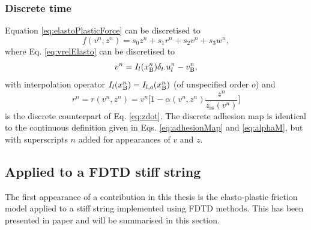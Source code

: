 \subsubsection{Discrete time}
Equation \eqref{eq:elastoPlasticForce} can be discretised to
\begin{equation}\label{eq:discForceFunction}
    f(v^n,z^n) = s_0z^n + s_1r^n+s_2v^n+s_3w^n,
\end{equation} 
where Eq. \eqref{eq:vrelElasto} can be discretised to
\begin{equation}\label{eq:vrelElastoDisc}
    v^n = I_l(x_{\text{B}}^n)\delta_{t\cdot}u_l^n - v_{\text{B}}^n,
\end{equation}
with interpolation operator $I_l(x_{\text{B}}^n) = I_{l,o}(x_{\text{B}}^n)$ (of unspecified order $o$) and
\begin{equation}\label{eq:r}
    r^n = r(v^n,z^n) = v^n\bigg[1-\alpha(v^n,z^n)\frac{z^n}{z_\text{ss}(v^n)}\bigg]
\end{equation}
is the discrete counterpart of Eq. \eqref{eq:zdot}. The discrete adhesion map is identical to the continuous definition given in Eqs. \eqref{eq:adhesionMap} and \eqref{eq:alphaM}, but with superscripts $n$ added for appearances of $v$ and $z$.

\subsection{Applied to a FDTD stiff string}
The first appearance of a contribution in this thesis is the elasto-plastic friction model applied to a stiff string implemented using FDTD methods. This has been presented in paper \citeP[C] and will be summarised in this section. 

